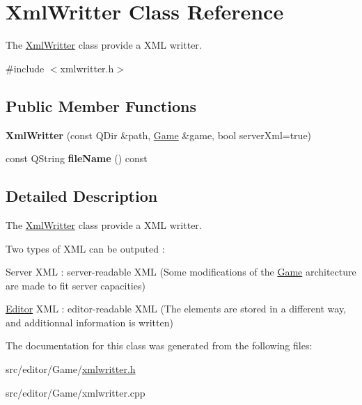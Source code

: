 \hypertarget{class_xml_writter}{\section{\-Xml\-Writter \-Class \-Reference}
\label{class_xml_writter}
}


\-The \hyperlink{class_xml_writter}{\-Xml\-Writter} class provide a \-X\-M\-L writter.  




{\ttfamily \#include $<$xmlwritter.\-h$>$}

\subsection*{\-Public \-Member \-Functions}
\begin{DoxyCompactItemize}
\item 
\hypertarget{class_xml_writter_a247375088eae579c8bb971391a592e1e}{{\bfseries \-Xml\-Writter} (const \-Q\-Dir \&path, \hyperlink{class_game}{\-Game} \&game, bool server\-Xml=true)}\label{class_xml_writter_a247375088eae579c8bb971391a592e1e}

\item 
\hypertarget{class_xml_writter_a109a7cf828b77e81bbfa18a53b2c5b25}{const \-Q\-String {\bfseries file\-Name} () const }\label{class_xml_writter_a109a7cf828b77e81bbfa18a53b2c5b25}

\end{DoxyCompactItemize}


\subsection{\-Detailed \-Description}
\-The \hyperlink{class_xml_writter}{\-Xml\-Writter} class provide a \-X\-M\-L writter. 

\-Two types of \-X\-M\-L can be outputed \-:
\begin{DoxyItemize}
\item \-Server \-X\-M\-L \-: server-\/readable \-X\-M\-L (\-Some modifications of the \hyperlink{class_game}{\-Game} architecture are made to fit server capacities)
\item \hyperlink{class_editor}{\-Editor} \-X\-M\-L \-: editor-\/readable \-X\-M\-L (\-The elements are stored in a different way, and additionnal information is written) 
\end{DoxyItemize}

\-The documentation for this class was generated from the following files\-:\begin{DoxyCompactItemize}
\item 
src/editor/\-Game/\hyperlink{xmlwritter_8h}{xmlwritter.\-h}\item 
src/editor/\-Game/xmlwritter.\-cpp\end{DoxyCompactItemize}
